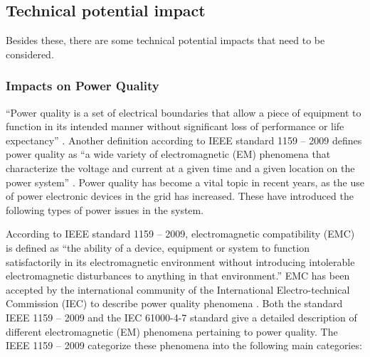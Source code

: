 \subsection{Technical potential impact}
Besides these, there are some technical potential impacts that need to be considered.

\subsubsection{Impacts on Power Quality}
“Power quality is a set of electrical boundaries that allow a piece of equipment to function in its intended manner without significant loss of performance or life expectancy” \cite{TPI1}. Another definition according to IEEE standard 1159 – 2009 defines power quality as “a wide variety of electromagnetic (EM) phenomena that characterize the voltage and current at a given time and a given location on the power system” \cite{TPI2}.  Power quality has become a vital topic in recent years, as the use of power electronic devices in the grid has increased. These have introduced the following types of power issues in the system.

According to IEEE standard 1159 – 2009, electromagnetic compatibility (EMC) is defined as “the ability of a device, equipment or system to function satisfactorily in its electromagnetic environment without introducing intolerable electromagnetic disturbances to anything in that environment.”  EMC has been accepted by the international community of the International Electro-technical Commission (IEC) to describe power quality phenomena \cite{TPI2}. Both the standard IEEE 1159 – 2009 and the IEC 61000-4-7 standard give a detailed description of different electromagnetic (EM) phenomena pertaining to power quality. The IEEE 1159 – 2009 categorize these phenomena into the following main categories:

